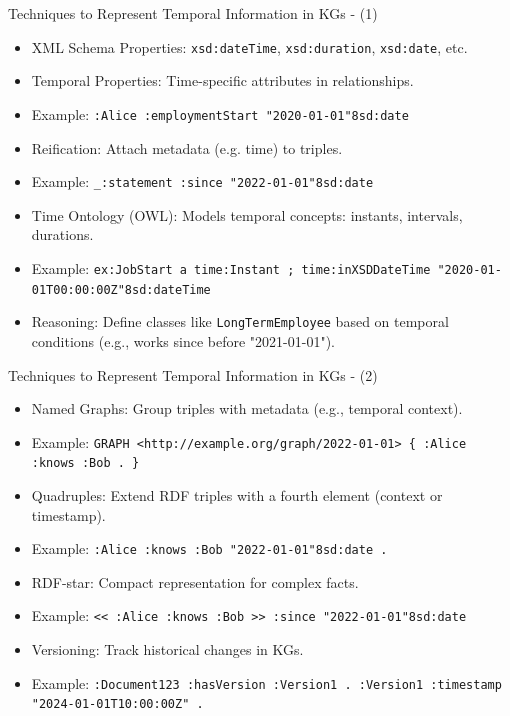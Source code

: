 \documentclass{beamer}
\begin{document}
    \begin{frame}{Techniques to Represent Temporal Information in KGs - (1)}
        \begin{itemize}
            \item XML Schema Properties: \texttt{xsd:dateTime}, \texttt{xsd:duration}, \texttt{xsd:date}, etc.
            \item Temporal Properties: Time-specific attributes in relationships.
            \item Example: \texttt{:Alice :employmentStart "2020-01-01"^^xsd:date}
            
            \item Reification: Attach metadata (e.g. time) to triples.
            \item Example: \texttt{_:statement :since "2022-01-01"^^xsd:date}
            
            \item Time Ontology (OWL): Models temporal concepts: instants, intervals, durations.
            \item Example: \texttt{ex:JobStart a time:Instant ; time:inXSDDateTime "2020-01-01T00:00:00Z"^^xsd:dateTime}
            \item Reasoning: Define classes like \texttt{LongTermEmployee} based on temporal conditions (e.g., works since before "2021-01-01").
        \end{itemize}
    \end{frame}

    \begin{frame}{Techniques to Represent Temporal Information in KGs - (2)}
        \begin{itemize}
            \item Named Graphs: Group triples with metadata (e.g., temporal context).
            \item Example: \texttt{GRAPH <http://example.org/graph/2022-01-01> \{ :Alice :knows :Bob . \}}
            \item Quadruples: Extend RDF triples with a fourth element (context or timestamp).
            \item Example: \texttt{:Alice :knows :Bob "2022-01-01"^^xsd:date .}
            
            \item RDF-star: Compact representation for complex facts.
            \item Example: \texttt{<< :Alice :knows :Bob >> :since "2022-01-01"^^xsd:date}
            
            \item Versioning: Track historical changes in KGs.
            \item Example: \texttt{:Document123 :hasVersion :Version1 . :Version1 :timestamp "2024-01-01T10:00:00Z" .}
        \end{itemize}
    \end{frame}
    
\end{document}
